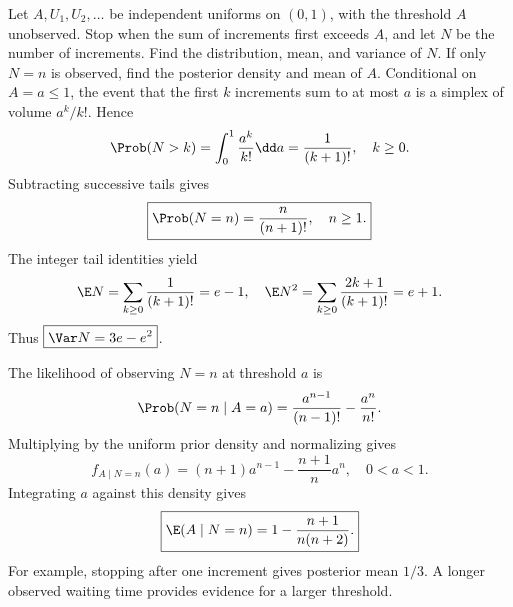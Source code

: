 Let $A,U_1,U_2,\ldots$ be independent uniforms on $(0,1)$, with the threshold $A$ unobserved. Stop when the sum of increments first exceeds $A$, and let $N$ be the number of increments. Find the distribution, mean, and variance of $N$. If only $N=n$ is observed, find the posterior density and mean of $A$.
\solution Conditional on $A=a\le1$, the event that the first $k$ increments sum to at most $a$ is a simplex of volume $a^k/k!$. Hence
\[
\Prob(N>k)=\int_0^1\frac{a^k}{k!}\dd a=\frac1{(k+1)!},\quad k\ge0.
\]
Subtracting successive tails gives
\[
\boxed{\Prob(N=n)=\frac n{(n+1)!},\quad n\ge1.}
\]
The integer tail identities yield
\[
\E N=\sum_{k\ge0}\frac1{(k+1)!}=e-1,
\quad \E N^2=\sum_{k\ge0}\frac{2k+1}{(k+1)!}=e+1.
\]
Thus $\boxed{\Var N=3e-e^2}$.

The likelihood of observing $N=n$ at threshold $a$ is
\[
\Prob(N=n\mid A=a)=\frac{a^{n-1}}{(n-1)!}-\frac{a^n}{n!}.
\]
Multiplying by the uniform prior density and normalizing gives
\[
\boxed{f_{A\mid N=n}(a)=(n+1)a^{n-1}-\frac{n+1}{n}a^n,
\quad0<a<1.}
\]
Integrating $a$ against this density gives
\[
\boxed{\E(A\mid N=n)=1-\frac{n+1}{n(n+2)}.}
\]
For example, stopping after one increment gives posterior mean $1/3$. A longer observed waiting time provides evidence for a larger threshold.
